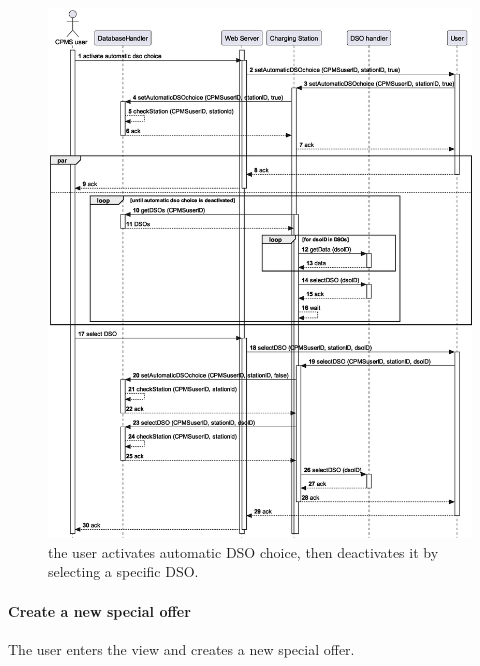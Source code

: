 \begin{figure}[h!]
    \centering
    \includegraphics[width=\columnwidth]{./images/sequences/cpms/dso}
    \caption{the user activates automatic DSO choice, then deactivates it by selecting a specific DSO.}
\end{figure}

\pagebreak

\paragraph{Create a new special offer} The user enters the  view and creates a new special offer.

